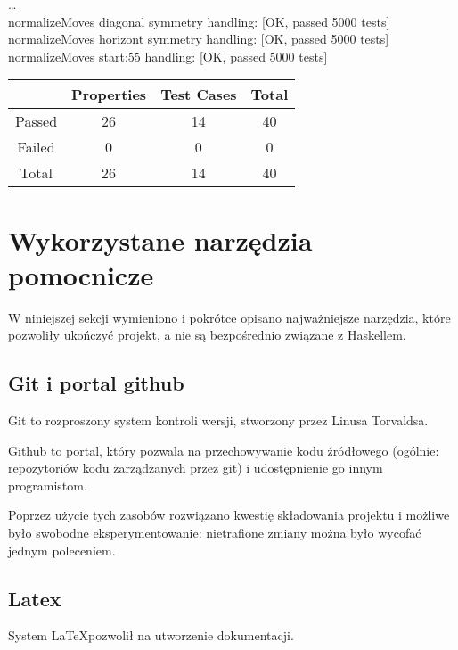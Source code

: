 \documentclass[10pt,leqno]{article}
\begin{document}
\begin{framed}
  \noindent \dots \\
  normalizeMoves diagonal symmetry handling: [OK, passed 5000 tests] \\ 
  normalizeMoves horizont symmetry handling: [OK, passed 5000 tests] \\
  normalizeMoves start:55 handling: [OK, passed 5000 tests] \\

\renewcommand{\arraystretch}{1.5}
\begin{tabular}{| c | c | c | c | } \hline
         & Properties &  Test Cases &  Total        \\ \hline
 Passed  & 26         &  14         &  40           \\ \hline
 Failed  & 0          &  0          &  0            \\ \hline
 Total   & 26         &  14         &  40           \\ \hline
\end{tabular}
\end{framed}

\newpage

\section{Wykorzystane narzędzia pomocnicze}

W niniejszej sekcji wymieniono i pokrótce opisano najważniejsze narzędzia, które pozwoliły ukończyć projekt,
a nie są bezpośrednio związane z Haskellem.

\subsection{Git i portal github}
Git \cite{git} to rozproszony system kontroli wersji, stworzony przez Linusa Torvaldsa. 

Github \cite{github} to portal, który pozwala na przechowywanie kodu źródłowego (ogólnie: repozytoriów kodu zarządzanych przez git)
i udostępnienie go innym programistom.

Poprzez użycie tych zasobów rozwiązano kwestię składowania projektu i możliwe było swobodne eksperymentowanie: nietrafione zmiany
można było wycofać jednym poleceniem.

\subsection{Latex}
System \LaTeX pozwolił na utworzenie dokumentacji.
\end{document}
